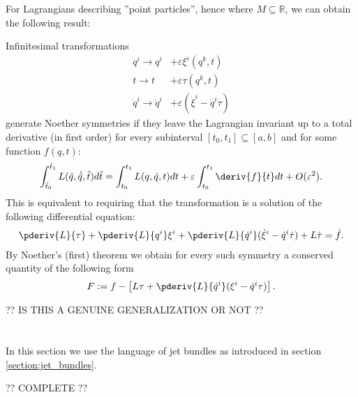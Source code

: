 
    For Lagrangians describing ''point particles'', hence where $M\subseteq\mathbb{R}$, we can obtain the following result:
    \begin{example}
        Infinitesimal transformations
        \begin{align*}
            q^i \longrightarrow q^i& + \varepsilon\xi^i(q^k, t)\\
            t \longrightarrow t& + \varepsilon\tau(q^k, t)\\
            \dot{q}^i \longrightarrow \dot{q}^i& + \varepsilon(\dot{\xi}^i - \dot{q}^i\dot{\tau})
        \end{align*}
        generate Noether symmetries if they leave the Lagrangian invariant up to a total derivative (in first order) for every subinterval $[t_0, t_1]\subseteq[a, b]$ and for some function $f(q, t)$:
        \begin{gather}
            \int_{\tilde{t}_0}^{\tilde{t}_1}L(\tilde{q}, \dot{\tilde{q}}, \tilde{t})d\tilde{t} = \int_{t_0}^{t_1}L(q, \dot{q}, t)dt + \varepsilon\int_{t_0}^{t_1}\deriv{f}{t}dt + O(\varepsilon^2).
        \end{gather}
        This is equivalent to requiring that the transformation is a solution of the following differential equation:
        \begin{gather}
            \pderiv{L}{\tau} + \pderiv{L}{q^i}\xi^i + \pderiv{L}{\dot{q}^i}(\dot{\xi}^i - \dot{q}^i\dot{\tau}) + L\dot{\tau} = \dot{f}.
        \end{gather}
        By Noether's (first) theorem we obtain for every such symmetry a conserved quantity of the following form
        \begin{gather}
            F := f - \left[L\tau + \pderiv{L}{\dot{q}^i}(\xi^i - \dot{q}^i\tau)\right].
        \end{gather}
    \end{example}

    ?? IS THIS A GENUINE GENERALIZATION OR NOT ??

\section{}

    In this section we use the language of jet bundles as introduced in section \ref{section:jet_bundles}.

    ?? COMPLETE ??